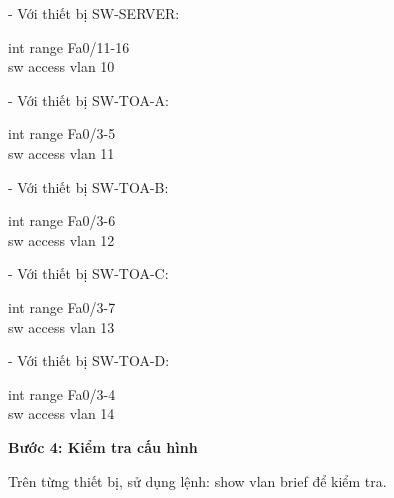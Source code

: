 \documentclass[12pt, a4paper]{article}
\begin{document}
	\begin{flushleft}
		- Với thiết bị SW-SERVER:
		\begin{tcolorbox}
			int range Fa0/11-16\\
			sw access vlan 10
		\end{tcolorbox}
		\par
		- Với thiết bị SW-TOA-A:
		\begin{tcolorbox}
			int range Fa0/3-5\\
			sw access vlan 11
		\end{tcolorbox}
		\par
		- Với thiết bị SW-TOA-B:
		\begin{tcolorbox}
			int range Fa0/3-6\\
			sw access vlan 12
		\end{tcolorbox}
		\par
		- Với thiết bị SW-TOA-C:
		\begin{tcolorbox}
			int range Fa0/3-7\\
			sw access vlan 13
		\end{tcolorbox}
		\par
		- Với thiết bị SW-TOA-D:
		\begin{tcolorbox}
			int range Fa0/3-4\\
			sw access vlan 14
		\end{tcolorbox}
	\end{flushleft}
	\begin{justify}
		\textbf{Bước 4: Kiểm tra cấu hình}	
	\end{justify}
	Trên từng thiết bị, sử dụng lệnh: show vlan brief để kiểm tra.
	
\end{document}
